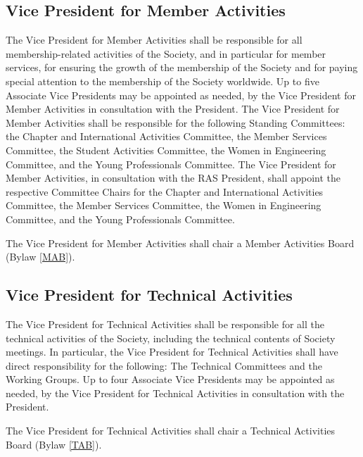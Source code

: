 \documentclass[10pt]{article}
\newcommand{\blref}[1]{Bylaw \ref{#1}}
\begin{document}
\subsection{Vice President for Member Activities}
The Vice President for Member Activities shall be responsible for all membership-related activities of the Society, and in particular for member services, for ensuring the growth of the membership of the Society and for paying special attention to the membership of the Society worldwide. Up to five Associate Vice Presidents may be appointed as needed, by the Vice President for Member Activities in consultation with the President. The Vice President for Member Activities shall be responsible for the following Standing Committees: the Chapter and International Activities Committee,  the Member Services Committee, the Student Activities Committee, the Women in Engineering Committee, and the Young Professionals Committee. The Vice President for Member Activities, in consultation with the RAS President, shall appoint the respective Committee Chairs for the Chapter and International Activities Committee,  the Member Services Committee, the Women in Engineering Committee, and the Young Professionals Committee.  %


The Vice President for Member Activities shall chair a Member Activities Board (\blref{MAB}). 



\subsection{Vice President for Technical Activities}
The Vice President for Technical Activities shall be responsible for all the technical activities of the Society, including the technical contents of Society meetings. In particular, the Vice President for Technical Activities shall have direct responsibility for the following: The Technical Committees and the Working Groups. Up to four Associate Vice Presidents may be appointed as needed, by the Vice President for Technical Activities in consultation with the President.

The Vice President for Technical Activities shall chair a Technical Activities Board (\blref{TAB}). 
\end{document}
